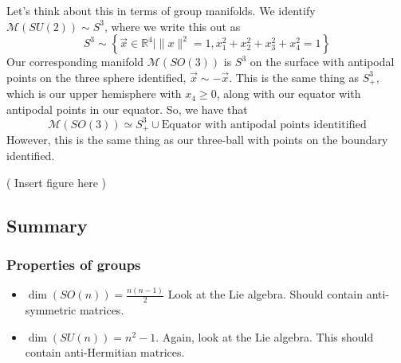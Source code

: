  Let's think about this in terms of group manifolds. 
 We identify $\mathcal{ M } ( SU ( 2) ) \sim S^ 3 $, where we write this out as 
 \[S^ 3 \sim \left\{  \vec{x} \in \mathbb{ R}  ^ 4 \mid  \| x \| ^ 2 = 1 , x_1^ 2 + x_2 ^ 2 + x_3 ^ 2 + x_4 ^ 2 = 1  \right\} 
\] Our corresponding manifold $ \mathcal{ M } ( SO ( 3) ) $ is $ S^ 3 $ on the surface 
with antipodal points on the three sphere identified, $ \vec{x} \sim  - \vec{x}$. 
This is the same thing as $ S^ 3 _ +  $, which is our upper hemisphere with $ x_4 \geq 0 $, 
along with our equator with antipodal points in our equator. So, we have that
\[
	\mathcal{ M } ( SO ( 3) ) \simeq S^3 _ + \cup \text{Equator with antipodal points identitified} 
\] 
 However, this is the same thing as our three-ball with points on
the boundary identified.

( Insert figure here ) 

\pagebreak

\subsection{Summary}

\subsubsection{Properties of groups}
\begin{itemize}
	\item $ \dim \left( SO ( n )  \right) = \frac{ n \left( n - 1  \right)  }{ 2 }$ Look at the Lie algebra. Should contain anti-symmetric matrices. 
	\item $ \dim \left( SU ( n )  \right)   = n ^ 2  - 1 $. 
		Again, look at the Lie algebra. This should contain 
		anti-Hermitian matrices. 
\end{itemize}

